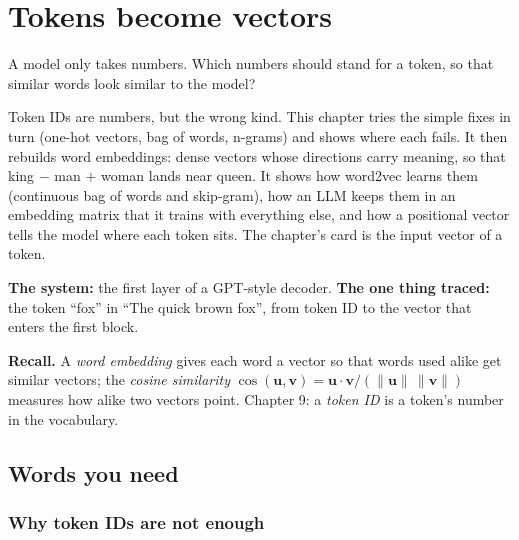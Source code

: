 \chapter{Tokens become vectors}
\label{ch:emb}

\begin{question}
A model only takes numbers. Which numbers should stand for a token, so that similar words look similar to the model?
\end{question}

\begin{whatfor}
Token IDs are numbers, but the wrong kind. This chapter tries the simple fixes in turn (one-hot vectors, bag of words, n-grams) and shows where each fails. It then rebuilds word embeddings: dense vectors whose directions carry meaning, so that king $-$ man $+$ woman lands near queen. It shows how word2vec learns them (continuous bag of words and skip-gram), how an LLM keeps them in an embedding matrix that it trains with everything else, and how a positional vector tells the model where each token sits. The chapter's card is the input vector of a token.
\end{whatfor}

\begin{setup}
\textbf{The system:} the first layer of a GPT-style decoder.
\textbf{The one thing traced:} the token ``fox'' in ``The quick brown fox'', from token ID to the vector that enters the first block.
\end{setup}

\begin{recall}
\textbf{Recall.} A \emph{word embedding} gives each word a vector so that words used alike get similar vectors; the \emph{cosine similarity} $\cos(\mathbf u,\mathbf v) = \mathbf u\cdot\mathbf v / (\lVert\mathbf u\rVert\,\lVert\mathbf v\rVert)$ measures how alike two vectors point. Chapter 9: a \emph{token ID} is a token's number in the vocabulary.
\end{recall}

\section{Words you need}

\subsection*{Why token IDs are not enough}

